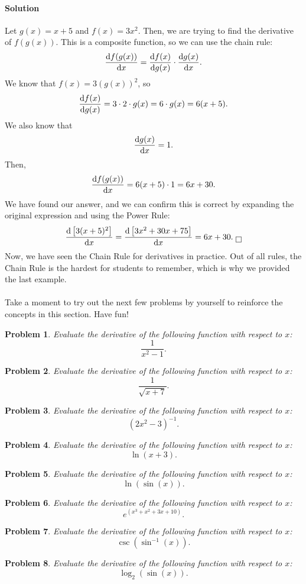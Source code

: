 \documentclass{article}
\newtheorem*{problem}{Problem}
\begin{document}
\paragraph{Solution} Let $g(x)=x+5$ and $f(x)=3x^2$. Then, we are trying to find the derivative of $f(g(x))$. This is a composite function, so we can use the chain rule:
\[\diff{f(g(x))}{x}=\diff{f(x)}{g(x)}\cdot \diff{g(x)}{x}.\]
We know that $f(x)=3(g(x))^2$, so 
\[\diff{f(x)}{g(x)}=3\cdot 2\cdot g(x)=6\cdot g(x)=6(x+5).\]
We also know that 
\[\diff{g(x)}{x}=1.\]
Then, 
\[\diff{f(g(x))}{x}=6(x+5)\cdot 1=6x+30.\]
We have found our answer, and we can confirm this is correct by expanding the original expression and using the Power Rule:
\[\diff{\left[3(x+5)^2\right]}{x}=\diff{\left[3x^2+30x+75\right]}{x}=6x+30.\text{ }\boxed{}\]
Now, we have seen the Chain Rule for derivatives in practice. Out of all rules, the Chain Rule is the hardest for students to remember, which is why we provided the last example.
\\
\\
Take a moment to try out the next few problems by yourself to reinforce the concepts in this section. Have fun!
\begin{problem}
Evaluate the derivative of the following function with respect to $x$:
\[\frac{1}{x^2-1}.\]
\end{problem}
\begin{problem}
Evaluate the derivative of the following function with respect to $x$:
\[\frac{1}{\sqrt{x+7}}.\]
\end{problem}
\begin{problem}
Evaluate the derivative of the following function with respect to $x$:
\[(2x^2-3)^{-1}.\]
\end{problem}
\begin{problem}
Evaluate the derivative of the following function with respect to $x$:
\[\ln(x+3).\]
\end{problem}
\begin{problem}
Evaluate the derivative of the following function with respect to $x$:
\[\ln(\sin(x)).\]
\end{problem}
\begin{problem}
Evaluate the derivative of the following function with respect to $x$:
\[e^{(x^3+x^2+3x+10)}.\]
\end{problem}
\begin{problem}
Evaluate the derivative of the following function with respect to $x$:
\[\csc(\sin^{-1}(x)).\]
\end{problem}
\begin{problem}
Evaluate the derivative of the following function with respect to $x$:
\[\log_2(\sin(x)).\]
\end{problem}
\end{document}
